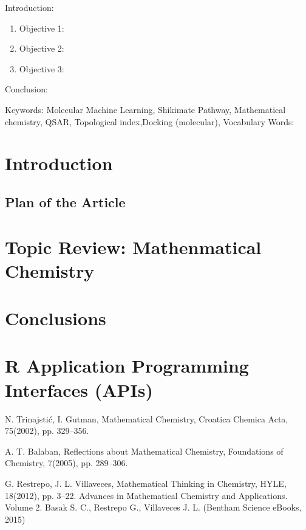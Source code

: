 

\twocolumn
\scriptsize
\begin{frontmatter}
		\title{}
		\author{}
		\address{The Mathematical Learning Space}
\end{frontmatter}	

Introduction:
\begin{enumerate}
\item Objective 1:
\item Objective 2:
\item Objective 3:
\end{enumerate}
Conclusion:

Keywords:  Molecular Machine Learning, Shikimate Pathway, Mathematical chemistry, QSAR, Topological index,Docking (molecular),
Vocabulary Words:

\section{Introduction}


\subsection{Plan of the Article}

\section{Topic Review: Mathenmatical Chemistry}


\section{Conclusions}


\section{R Application Programming Interfaces (APIs)}





\begin{thebibliography}{00}

N. Trinajstić, I. Gutman, 
\newblock Mathematical Chemistry, 
\newblock Croatica Chemica Acta, 75(2002), pp. 329–356.

A. T. Balaban, 
\newblock Reflections about Mathematical Chemistry, 
\newblock Foundations of Chemistry, 7(2005), pp. 289–306.

G. Restrepo, J. L. Villaveces, 
\newblock Mathematical Thinking in Chemistry, HYLE, 18(2012), pp. 3–22.
\newblock Advances in Mathematical Chemistry and Applications. Volume 2. Basak S. C., Restrepo G., Villaveces J. L. (Bentham Science eBooks, 2015)

\end{thebibliography}

